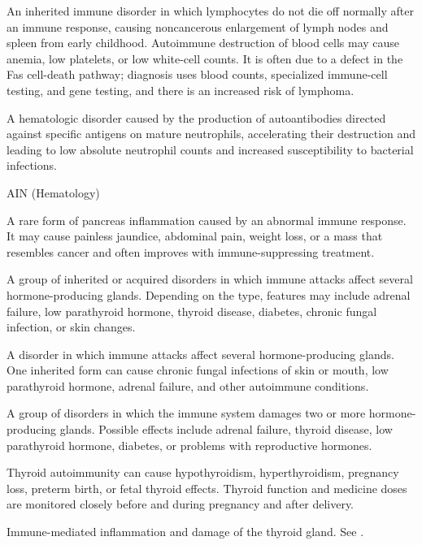  An inherited immune disorder in which lymphocytes do not die off normally after an immune response, causing noncancerous enlargement of lymph nodes and spleen from early childhood. Autoimmune destruction of blood cells may cause anemia, low platelets, or low white-cell counts. It is often due to a defect in the Fas cell-death pathway; diagnosis uses blood counts, specialized immune-cell testing, and gene testing, and there is an increased risk of lymphoma.

 A hematologic disorder caused by the production of autoantibodies directed against specific antigens on mature neutrophils, accelerating their destruction and leading to low absolute neutrophil counts and increased susceptibility to bacterial infections.

\synonyms
AIN (Hematology)

 A rare form of pancreas inflammation caused by an abnormal immune response. It may cause painless jaundice, abdominal pain, weight loss, or a mass that resembles cancer and often improves with immune-suppressing treatment.

 A group of inherited or acquired disorders in which immune attacks affect several hormone-producing glands. Depending on the type, features may include adrenal failure, low parathyroid hormone, thyroid disease, diabetes, chronic fungal infection, or skin changes.

 A disorder in which immune attacks affect several hormone-producing glands. One inherited form can cause chronic fungal infections of skin or mouth, low parathyroid hormone, adrenal failure, and other autoimmune conditions.

 A group of disorders in which the immune system damages two or more hormone-producing glands. Possible effects include adrenal failure, thyroid disease, low parathyroid hormone, diabetes, or problems with reproductive hormones.

 Thyroid autoimmunity can cause hypothyroidism, hyperthyroidism, pregnancy loss, preterm birth, or fetal thyroid effects. Thyroid function and medicine doses are monitored closely before and during pregnancy and after delivery.

 Immune-mediated inflammation and damage of the thyroid gland. See .

